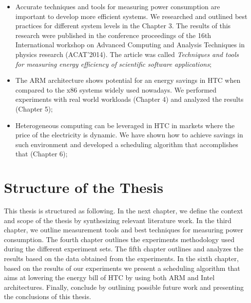 \begin{itemize}
  \item Accurate techniques and tools for measuring power consumption are important to develop more efficient systems. We researched and outlined best practices for different system levels in the Chapter 3. The results of this research were published in the conference proceedings of the 16th International workshop on Advanced Computing and Analysis Techniques in physics research (ACAT'2014). The article was called \textit{Techniques and tools for measuring energy efficiency of scientific software applications};

  \item The ARM architecture shows potential for an energy savings in HTC when compared to the x86 systems widely used nowadays. We performed experiments with real world workloads (Chapter 4) and analyzed the results (Chapter 5); 

  \item Heterogeneous computing can be leveraged in HTC in markets where the price of the electricity is dynamic. We have shown how to achieve savings in such environment and developed a scheduling algorithm that accomplishes that (Chapter 6);
\end{itemize}



\section{Structure of the Thesis}
This thesis is structured as following. In the next chapter, we define the context and scope
of the thesis by synthesizing relevant literature work. In the third chapter, we
outline measurement tools and best techniques for measuring power consumption. The fourth chapter outlines the
experiments methodology used during the different experiment sets. The fifth chapter outlines and analyzes the results based on
the data obtained from the experiments. In the sixth chapter, based on the results of our experiments we present a scheduling algorithm that aims at lowering the energy bill of HTC by using both ARM and Intel architectures. Finally, conclude by outlining possible future work and presenting the
conclusions of this thesis.
